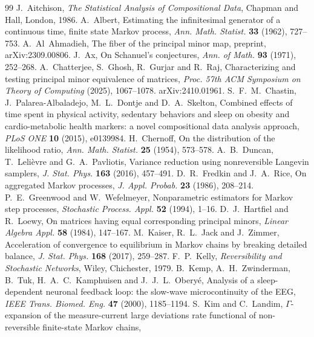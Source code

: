 \documentclass[11pt]{article}
\theoremstyle{definition}
\theoremstyle{remark}
\begin{document}
\begin{thebibliography}{99}\small
{} J.~Aitchison, \emph{The Statistical Analysis of
 Compositional Data}, Chapman and Hall, London, 1986.
 A.~Albert, Estimating the infinitesimal generator of a
 continuous time, finite state Markov process, \emph{Ann. Math. Statist.}
 \textbf{33} (1962), 727--753.
 A.~Al~Ahmadieh, The fiber of the principal minor map,
 preprint, arXiv:2309.00806.
 J.~Ax, On Schanuel's conjectures, \emph{Ann. of Math.}
 \textbf{93} (1971), 252--268.
 A.~Chatterjee, S.~Ghosh, R.~Gurjar and R.~Raj,
 Characterizing and testing principal minor equivalence of matrices,
 \emph{Proc. 57th ACM Symposium on Theory of Computing} (2025), 1067--1078.
 arXiv:2410.01961.
 S.~F.~M.~Chastin, J.~Palarea-Albaladejo, M.~L.~Dontje
 and D.~A.~Skelton, Combined effects of time spent in physical activity,
 sedentary behaviors and sleep on obesity and cardio-metabolic health markers:
 a novel compositional data analysis approach, \emph{PLoS ONE} \textbf{10}
 (2015), e0139984.
 H.~Chernoff, On the distribution of the likelihood
 ratio, \emph{Ann. Math. Statist.} \textbf{25} (1954), 573--578.
 A.~B.~Duncan, T.~Leli\`evre and G.~A.~Pavliotis, Variance
 reduction using nonreversible Langevin samplers, \emph{J. Stat. Phys.}
 \textbf{163} (2016), 457--491.
 D.~R.~Fredkin and J.~A.~Rice, On aggregated Markov processes,
 \emph{J. Appl. Probab.} \textbf{23} (1986), 208--214.
 P.~E.~Greenwood and W.~Wefelmeyer, Nonparametric estimators
 for Markov step processes, \emph{Stochastic Process. Appl.} \textbf{52}
 (1994), 1--16.
 D.~J.~Hartfiel and R.~Loewy, On matrices having equal
 corresponding principal minors, \emph{Linear Algebra Appl.} \textbf{58}
 (1984), 147--167.
 M.~Kaiser, R.~L.~Jack and J.~Zimmer, Acceleration of
 convergence to equilibrium in Markov chains by breaking detailed balance,
 \emph{J. Stat. Phys.} \textbf{168} (2017), 259--287.
 F.~P.~Kelly, \emph{Reversibility and Stochastic Networks},
 Wiley, Chichester, 1979.
 B.~Kemp, A.~H.~Zwinderman, B.~Tuk, H.~A.~C.~Kamphuisen and
 J.~J.~L.~Obery\'e, Analysis of a sleep-dependent neuronal feedback loop: the
 slow-wave microcontinuity of the EEG, \emph{IEEE Trans. Biomed. Eng.}
 \textbf{47} (2000), 1185--1194.
 S.~Kim and C.~Landim, $\Gamma$-expansion of the measure-current
 large deviations rate functional of non-reversible finite-state Markov chains,

\end{thebibliography}
\end{document}
